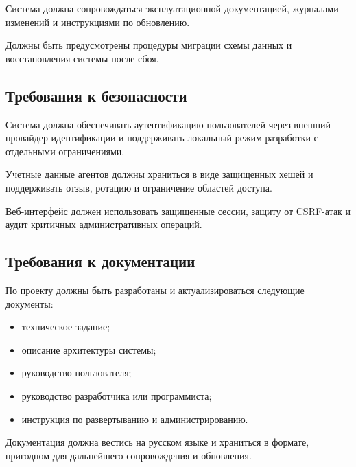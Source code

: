 \headingtextsep

Система должна сопровождаться эксплуатационной документацией, журналами изменений и инструкциями по обновлению.

Должны быть предусмотрены процедуры миграции схемы данных и восстановления системы после сбоя.

\textheadingsep
\subsection{Требования к безопасности}

\headingtextsep

Система должна обеспечивать аутентификацию пользователей через внешний провайдер идентификации и поддерживать локальный режим разработки с отдельными ограничениями.

Учетные данные агентов должны храниться в виде защищенных хешей и поддерживать отзыв, ротацию и ограничение областей доступа.

Веб-интерфейс должен использовать защищенные сессии, защиту от CSRF-атак и аудит критичных административных операций.

\textheadingsep
\subsection{Требования к документации}

\headingtextsep

По проекту должны быть разработаны и актуализироваться следующие документы:

\begin{itemize}
    \item техническое задание;
    \item описание архитектуры системы;
    \item руководство пользователя;
    \item руководство разработчика или программиста;
    \item инструкция по развертыванию и администрированию.
\end{itemize}

Документация должна вестись на русском языке и храниться в формате, пригодном для дальнейшего сопровождения и обновления.